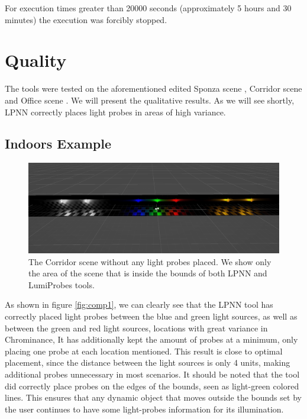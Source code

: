 For execution times greater than 20000 seconds (approximately 5 hours and 30 minutes) the execution was forcibly stopped. 

\section{Quality}
\label{sec:4_quality}

The tools were tested on the aforementioned edited Sponza scene \parencite{Sponza2017}, Corridor scene \parencite{Corridor2021} and Office scene \parencite{Office2021}. We will present the qualitative results. As we will see shortly, LPNN correctly places light probes in areas of high variance.

\subsection{Indoors Example}

\begin{figure}[h]
	\centering
	\includegraphics[width=\linewidth]{Graphics/results/corridor.jpg}
	\caption{The Corridor scene \parencite{Corridor2021} without any light probes placed. We show only the area of the scene that is inside the bounds of both LPNN and LumiProbes tools.}
	\label{fig:corridor}
\end{figure}

As shown in figure \ref{fig:comp1}, we can clearly see that the LPNN tool has correctly placed light probes between the blue and green light sources, as well as between the green and red light sources, locations with great variance in Chrominance, It has additionally kept the amount of probes at a minimum, only placing one probe at each location mentioned. This result is close to optimal placement, since the distance between the light sources is only 4 units, making additional probes unnecessary in most scenarios. It should be noted that the tool did correctly place probes on the edges of the bounds, seen as light-green colored lines. This ensures that any dynamic object that moves outside the bounds set by the user continues to have some light-probes information for its illumination. 

